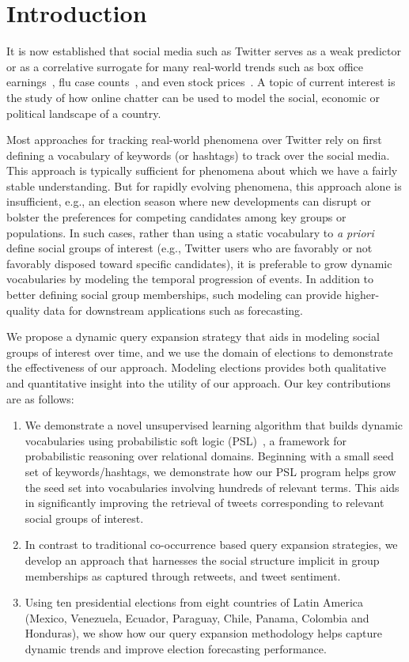 
\section{Introduction}
It is now established that social media such as Twitter serves as a weak
predictor or as a correlative surrogate for many real-world trends such
as %
box office earnings~\cite{asur2010predicting}, flu case counts~\cite{culotta2010towards}, and even stock 
prices~\cite{bollen2011twitter}. A topic of current interest is the study of how
online chatter can be used to model
the social, economic or political landscape of a country.

Most approaches for tracking real-world phenomena over Twitter rely on first defining a vocabulary
of keywords (or hashtags) to track over the social media. This approach is typically sufficient for
phenomena about which we have a fairly stable understanding. But for rapidly evolving phenomena, this approach alone is insufficient,
e.g., an election season where new developments can disrupt or bolster the preferences for competing candidates
among key groups or populations.
In such cases, rather than %
using a static vocabulary to {\it a priori} define social groups
of interest (e.g., Twitter users who are favorably or not favorably disposed
toward specific candidates), it is preferable to grow dynamic vocabularies by modeling the temporal progression of
events. In addition to better defining social group memberships, such modeling can provide
higher-quality data for downstream applications such as forecasting.

We propose a dynamic query expansion strategy that aids in modeling social groups of interest over time, and
we use the domain of elections to demonstrate the effectiveness of our approach. Modeling elections provides both
qualitative and quantitative insight into the utility of our approach.
Our key contributions are as follows:
\begin{enumerate}
\item We demonstrate
a novel unsupervised learning algorithm that builds dynamic vocabularies using probabilistic soft logic (PSL)~\cite{kimmig2012short}, a framework for probabilistic reasoning over relational domains. Beginning with a small seed set of keywords/hashtags, we demonstrate how our PSL program helps grow the seed set into  vocabularies involving hundreds of relevant terms. This aids in significantly improving the retrieval of tweets corresponding to relevant
social groups of interest.
\item In contrast to traditional co-occurrence based query expansion strategies, we develop an approach that harnesses the social structure implicit in group memberships as captured through retweets, and tweet sentiment.
\item Using ten presidential elections from eight countries of Latin America (Mexico, Venezuela, Ecuador, Paraguay, Chile, Panama, Colombia and Honduras), we show how our query expansion methodology helps capture dynamic trends and improve election forecasting performance. 
\end{enumerate}

